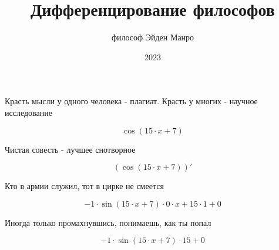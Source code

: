 \documentclass[a4paper,12pt]{article}
\title{\textbf{Дифференцирование философов}}
\author{философ Эйден Манро}
\date{2023}
\begin{document}
\maketitle
\begin{center}
Красть мысли у одного человека - плагиат. Красть у многих - научное исследование
\end{center}


\begin{center}
\begin{equation}
\cos(15 \cdot x + 7)
\end{equation}
\end{center}

\begin{center}
Чистая совесть - лучшее снотворное
\end{center}


\begin{center}
\begin{equation}
(\cos(15 \cdot x + 7))'
\end{equation}
\end{center}

\begin{center}
Кто в армии служил, тот в цирке не смеется
\end{center}


\begin{center}
\begin{equation}
-1 \cdot \sin(15 \cdot x + 7) \cdot 0 \cdot x + 15 \cdot 1 + 0
\end{equation}
\end{center}

\begin{center}
Иногда только промахнувшись, понимаешь, как ты попал
\end{center}


\begin{center}
\begin{equation}
-1 \cdot \sin(15 \cdot x + 7) \cdot 15 + 0
\end{equation}
\end{center}
\end{document}
